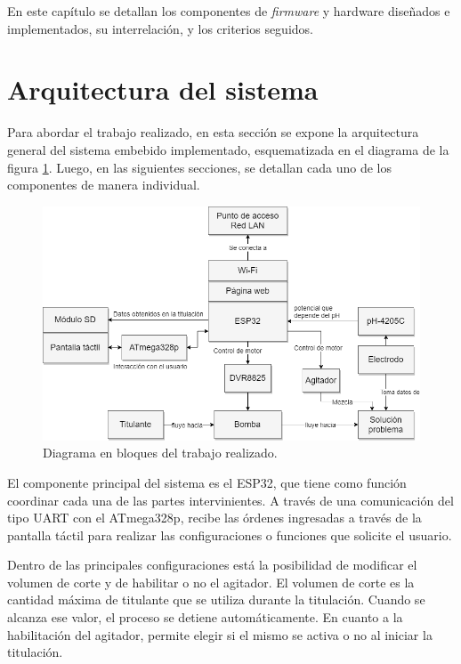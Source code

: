 En este capítulo se detallan los componentes de \textit{firmware} y hardware diseñados e implementados, su interrelación, y los criterios seguidos.

\section{Arquitectura del sistema}

Para abordar el trabajo realizado, en esta sección se expone la arquitectura general del sistema embebido implementado, esquematizada en el diagrama de la figura \ref{fig:diagramaCompleto}. Luego, en las siguientes secciones, se detallan cada uno de los componentes de manera individual.

\begin{figure}[htbp]
	\centering
	\includegraphics[width=1.0\textwidth]{./Figures/DiagramaBloquesCompleto.png}
	\caption{Diagrama en bloques del trabajo realizado.}
	\label{fig:diagramaCompleto}
\end{figure}

El componente principal del sistema es el ESP32, que tiene como función coordinar cada una de las partes intervinientes. A través de una comunicación del tipo UART con el ATmega328p, recibe las órdenes ingresadas a través de la pantalla táctil para realizar las configuraciones o funciones que solicite el usuario.

Dentro de las principales configuraciones está la posibilidad de modificar el volumen de corte y de habilitar o no el agitador. El volumen de corte es la cantidad máxima de titulante que se utiliza durante la titulación. Cuando se alcanza ese valor, el proceso se detiene automáticamente. En cuanto a la habilitación del agitador, permite elegir si el mismo se activa o no al iniciar la titulación.

